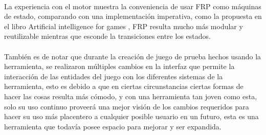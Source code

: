 \documentclass{standalone}
\begin{document}
\paragraph{}
La experiencia con el motor muestra la conveniencia de usar FRP como máquinas de estado, comparando con una implementación imperativa, como la propuesta en el libro Artificial intelligence for games \cite{millington2016artificial}, FRP resulta mucho más modular y reutilizable mientras que esconde la transiciones entre los estados.

\paragraph{}
También es de notar que durante la creación de juego de prueba hechos usando la herramienta, se realizaron múltiples cambios en la interfaz que permite la interacción de las entidades del juego con los diferentes sistemas de la herramienta, esto es debido a que en ciertas circunstancias ciertas formas de hacer las cosas resulta más cómodo, y con una herramienta tan joven como esta, solo su uso continuo proveerá una mejor visión de los cambios requeridos para hacer su uso más placentero a cualquier posible usuario en un futuro, esta es una herramienta que todavía posee espacio para mejorar y ser expandida.
\end{document}
